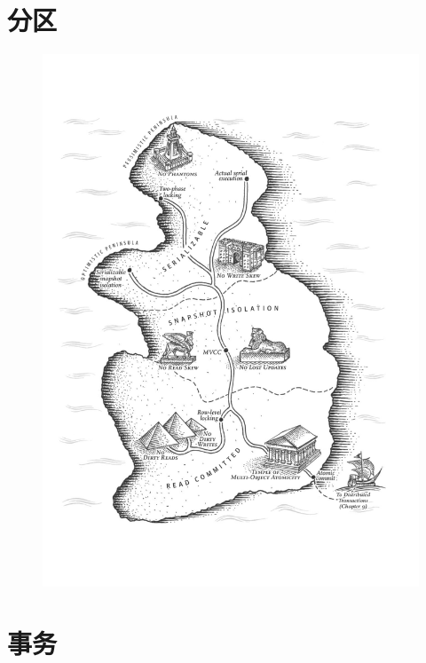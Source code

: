 \documentclass{book}
\begin{document}
\chapter{分区}
\label{ch:ch6}

\newpage
\begin{figure}
  \centering
  \includegraphics[width=\textwidth]{img/ch7.png}
  \label{fig:ch7}
\end{figure}

\chapter{事务}
\label{ch:ch7}
\end{document}
